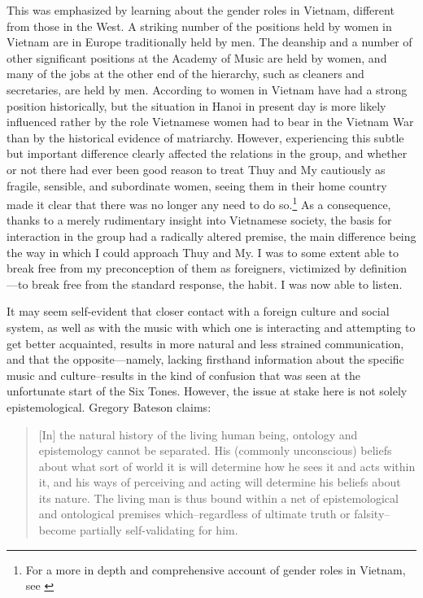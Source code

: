 \documentclass[a4paper]{article}
\begin{document}
This was emphasized by learning about the gender roles in Vietnam, different from those in the West. A striking number of the positions held by women in Vietnam are in Europe traditionally held by men. The deanship and a number of other significant positions at the Academy of Music are held by women, and many of the jobs at the other end of the hierarchy, such as cleaners and secretaries, are held by men. According to \autocite{VanKy2002} women in Vietnam have had a strong position historically, but the situation in Hanoi in present day is more likely influenced rather by the role Vietnamese women had to bear in the Vietnam War than by the historical evidence of matriarchy. However, experiencing this subtle but important difference clearly affected the relations in the group, and whether or not there had ever been good reason to treat Thuy and My cautiously as fragile, sensible, and subordinate women, seeing them in their home country made it clear that there was no longer any need to do so.\footnote{For a more in depth and comprehensive account of gender roles in Vietnam, see \autocite{drummond2004}} As a consequence, thanks to a merely rudimentary insight into Vietnamese society, the basis for interaction in the group had a radically altered premise, the main difference being the way in which I could approach Thuy and My. I was to some extent able to break free from my preconception of them as foreigners, victimized by definition—to break free from the standard response, the habit. I was now able to listen.


It may seem self-evident that closer contact with a foreign culture and social system, as well as with the music with which one is interacting and attempting to get better acquainted, results in more natural and less strained communication, and that the opposite—namely, lacking firsthand information about the specific music and culture--results in the kind of confusion that was seen at the unfortunate start of the Six Tones. However, the issue at stake here is not solely epistemological. Gregory Bateson claims: 
\begin{quote}
  [In] the natural history of the living human being, ontology and epistemology
  cannot be separated. His (commonly unconscious) beliefs about what sort of
  world it is will determine how he sees it and acts within it, and his ways
  of perceiving and acting will determine his beliefs about its nature. The
  living man is thus bound within a net of epistemological and ontological
  premises which--regardless of ultimate truth or falsity--become partially
  self-validating for him. \autocite[314]{bateson72:steps}
\end{quote}
\end{document}
